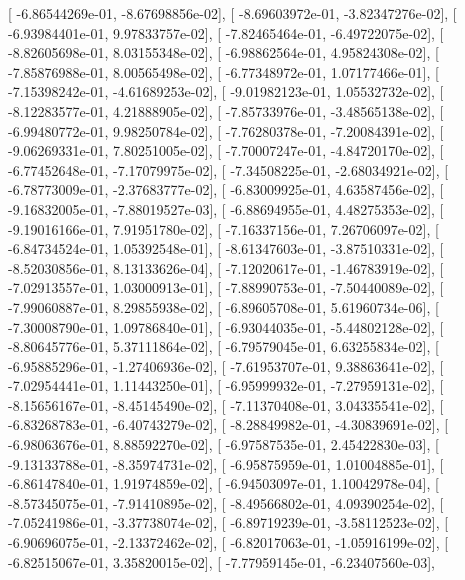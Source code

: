 \documentclass{article}
\begin{document}
       [ -6.86544269e-01,  -8.67698856e-02],
       [ -8.69603972e-01,  -3.82347276e-02],
       [ -6.93984401e-01,   9.97833757e-02],
       [ -7.82465464e-01,  -6.49722075e-02],
       [ -8.82605698e-01,   8.03155348e-02],
       [ -6.98862564e-01,   4.95824308e-02],
       [ -7.85876988e-01,   8.00565498e-02],
       [ -6.77348972e-01,   1.07177466e-01],
       [ -7.15398242e-01,  -4.61689253e-02],
       [ -9.01982123e-01,   1.05532732e-02],
       [ -8.12283577e-01,   4.21888905e-02],
       [ -7.85733976e-01,  -3.48565138e-02],
       [ -6.99480772e-01,   9.98250784e-02],
       [ -7.76280378e-01,  -7.20084391e-02],
       [ -9.06269331e-01,   7.80251005e-02],
       [ -7.70007247e-01,  -4.84720170e-02],
       [ -6.77452648e-01,  -7.17079975e-02],
       [ -7.34508225e-01,  -2.68034921e-02],
       [ -6.78773009e-01,  -2.37683777e-02],
       [ -6.83009925e-01,   4.63587456e-02],
       [ -9.16832005e-01,  -7.88019527e-03],
       [ -6.88694955e-01,   4.48275353e-02],
       [ -9.19016166e-01,   7.91951780e-02],
       [ -7.16337156e-01,   7.26706097e-02],
       [ -6.84734524e-01,   1.05392548e-01],
       [ -8.61347603e-01,  -3.87510331e-02],
       [ -8.52030856e-01,   8.13133626e-04],
       [ -7.12020617e-01,  -1.46783919e-02],
       [ -7.02913557e-01,   1.03000913e-01],
       [ -7.88990753e-01,  -7.50440089e-02],
       [ -7.99060887e-01,   8.29855938e-02],
       [ -6.89605708e-01,   5.61960734e-06],
       [ -7.30008790e-01,   1.09786840e-01],
       [ -6.93044035e-01,  -5.44802128e-02],
       [ -8.80645776e-01,   5.37111864e-02],
       [ -6.79579045e-01,   6.63255834e-02],
       [ -6.95885296e-01,  -1.27406936e-02],
       [ -7.61953707e-01,   9.38863641e-02],
       [ -7.02954441e-01,   1.11443250e-01],
       [ -6.95999932e-01,  -7.27959131e-02],
       [ -8.15656167e-01,  -8.45145490e-02],
       [ -7.11370408e-01,   3.04335541e-02],
       [ -6.83268783e-01,  -6.40743279e-02],
       [ -8.28849982e-01,  -4.30839691e-02],
       [ -6.98063676e-01,   8.88592270e-02],
       [ -6.97587535e-01,   2.45422830e-03],
       [ -9.13133788e-01,  -8.35974731e-02],
       [ -6.95875959e-01,   1.01004885e-01],
       [ -6.86147840e-01,   1.91974859e-02],
       [ -6.94503097e-01,   1.10042978e-04],
       [ -8.57345075e-01,  -7.91410895e-02],
       [ -8.49566802e-01,   4.09390254e-02],
       [ -7.05241986e-01,  -3.37738074e-02],
       [ -6.89719239e-01,  -3.58112523e-02],
       [ -6.90696075e-01,  -2.13372462e-02],
       [ -6.82017063e-01,  -1.05916199e-02],
       [ -6.82515067e-01,   3.35820015e-02],
       [ -7.77959145e-01,  -6.23407560e-03],
\end{document}
